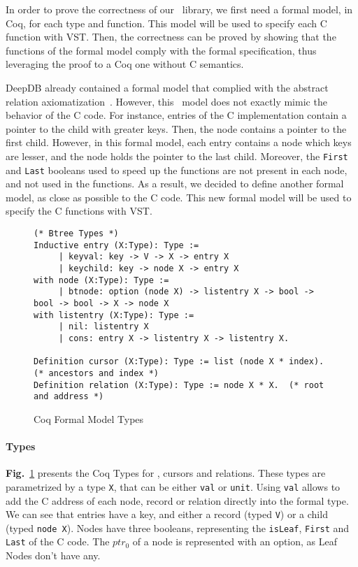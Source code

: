 In order to prove the correctness of our \btrees\ library, we first need a formal model, in Coq, for each type and function.
This model will be used to specify each C function with VST.
Then, the correctness can be proved by showing that the functions of the formal model comply with the formal specification, thus leveraging the proof to a Coq one without C semantics.

DeepDB already contained a formal model that complied with the abstract relation axiomatization~\cite{brian}.
However, this \btree\ model does not exactly mimic the behavior of the C code.
For instance, entries of the C implementation contain a pointer to the child with greater keys.
Then, the node contains a pointer to the first child.
However, in this formal model, each entry contains a node which keys are lesser, and the node holds the pointer to the last child.
Moreover, the \texttt{First} and \texttt{Last} booleans used to speed up the functions are not present in each node, and not used in the functions.
As a result, we decided to define another formal model, as close as possible to the C code.
This new formal model will be used to specify the C functions with VST.


\begin{figure}
\begin{lstlisting}[language=Coq]
(* Btree Types *)
Inductive entry (X:Type): Type :=
     | keyval: key -> V -> X -> entry X
     | keychild: key -> node X -> entry X
with node (X:Type): Type :=
     | btnode: option (node X) -> listentry X -> bool -> bool -> bool -> X -> node X
with listentry (X:Type): Type :=
     | nil: listentry X
     | cons: entry X -> listentry X -> listentry X.

Definition cursor (X:Type): Type := list (node X * index). (* ancestors and index *)
Definition relation (X:Type): Type := node X * X.  (* root and address *)
\end{lstlisting}
\label{coqtypes}
\caption{Coq Formal Model Types}
\end{figure}

\paragraph{Types}\textbf{Fig.}~\ref{coqtypes} presents the Coq Types for \btrees, cursors and relations. 
These types are parametrized by a type \texttt{X}, that can be either \texttt{val} or \texttt{unit}.
Using \texttt{val} allows to add the C address of each node, record or relation directly into the formal type.
We can see that entries have a key, and either a record (typed \texttt{V}) or a child (typed \texttt{node X}).
Nodes have three booleans, representing the \texttt{isLeaf}, \texttt{First} and \texttt{Last} of the C code.
The $ptr_0$ of a node is represented with an option, as Leaf Nodes don't have any.

